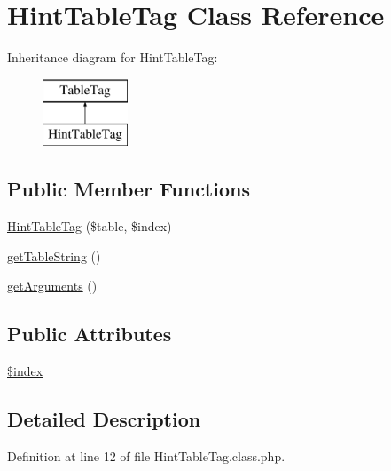 \hypertarget{classHintTableTag}{\section{Hint\+Table\+Tag Class Reference}
\label{classHintTableTag}
}
Inheritance diagram for Hint\+Table\+Tag\+:\begin{figure}[H]
\begin{center}
\leavevmode
\includegraphics[height=2.000000cm]{classHintTableTag}
\end{center}
\end{figure}
\subsection*{Public Member Functions}
\begin{DoxyCompactItemize}
\item 
\hyperlink{classHintTableTag_ab06d4290d105fc2f64d5a4835aed9130}{Hint\+Table\+Tag} (\$table, \$index)
\item 
\hyperlink{classHintTableTag_a39753285a32f1624ab5df5768ce93cdf}{get\+Table\+String} ()
\item 
\hyperlink{classHintTableTag_a774a5f31c9ceb19dd411a92000066741}{get\+Arguments} ()
\end{DoxyCompactItemize}
\subsection*{Public Attributes}
\begin{DoxyCompactItemize}
\item 
\hyperlink{classHintTableTag_aaed2fb461aff0380f77a16df5d04298c}{\$index}
\end{DoxyCompactItemize}


\subsection{Detailed Description}


Definition at line 12 of file Hint\+Table\+Tag.\+class.\+php.



